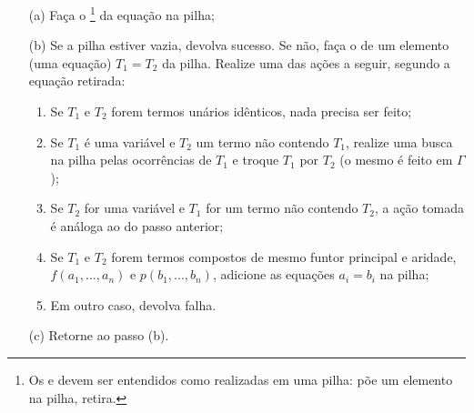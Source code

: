 \documentclass{article}
\begin{document}
\begin{itemize}
    \item[(a)] Faça o \footnote{Os  e  devem ser entendidos como realizadas em uma pilha:  põe um elemento na pilha,  retira.} da equação na pilha;
    \item[(b)] Se a pilha estiver vazia, devolva sucesso. Se não, faça o  de um elemento (uma equação) $T_1 = T_2$ da pilha. Realize uma das ações a seguir, segundo a equação retirada:
      \begin{enumerate}
        \item Se $T_1$ e $T_2$ forem termos unários idênticos, nada precisa ser feito;
        \item Se $T_1$ é uma variável e $T_2$ um termo não contendo $T_1$, realize uma busca na pilha pelas ocorrências de $T_1$ e troque $T_1$ por $T_2$ (o mesmo é feito em $\Gamma$);
        \item Se $T_2$ for uma variável e $T_1$ for um termo não contendo $T_2$, a ação tomada é análoga ao do passo anterior;
        \item Se $T_1$ e $T_2$ forem termos compostos de mesmo funtor principal e aridade, $f(a_1, ..., a_n)$ e $p(b_1, ..., b_n)$, adicione as equações $a_i = b_i$ na pilha;
        \item Em outro caso, devolva falha.
      \end{enumerate}
    \item[(c)] Retorne ao passo (b).
\end{itemize}






\end{document}
